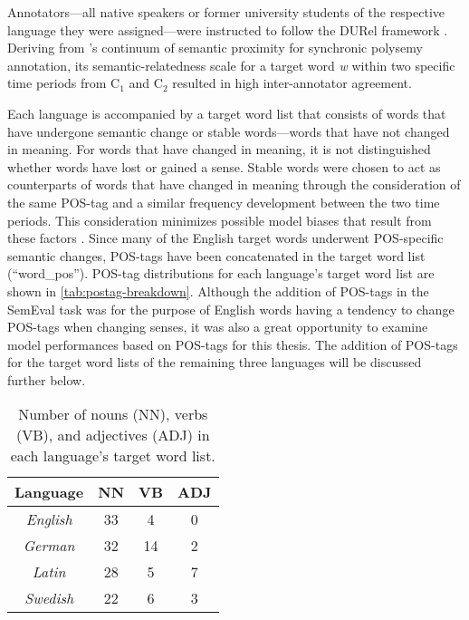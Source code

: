 Annotators—all native speakers or former university students of the respective language they were assigned—were instructed to follow the DURel framework \citep{DURel2018}. Deriving from \citet{blank1997prinzipien}’s continuum of semantic proximity for synchronic polysemy annotation, its semantic-relatedness scale for a target word \emph{w} within two specific time periods from C$_1$ and C$_2$ resulted in high inter-annotator agreement. 
	
Each language is accompanied by a target word list that consists of words that have undergone semantic change or stable words—words that have not changed in meaning. For words that have changed in meaning, it is not distinguished whether words have lost or gained a sense. Stable words were chosen to act as counterparts of words that have changed in meaning through the consideration of the same POS-tag and a similar frequency development between the two time periods. This consideration minimizes possible model biases that result from these factors \citep{dubossarsky-etal-2017-outta}. Since many of the English target words underwent POS-specific semantic changes, POS-tags have been concatenated in the target word list (“word\_pos”). POS-tag distributions for each language's target word list are shown in \autoref{tab:postag-breakdown}. Although the addition of POS-tags in the SemEval task was for the purpose of English words having a tendency to change POS-tags when changing senses, it was also a great opportunity to examine model performances based on POS-tags for this thesis. The addition of POS-tags for the target word lists of the remaining three languages will be discussed further below.
 
\begin{table}[h]
\small
\centering
\begin{tabular}{|c|c|c|c|}
\hline
\textbf{Language} & \textbf{NN} & \textbf{VB} & \textbf{ADJ} \\ \hline
\textit{English}                          & 33          & 4           & 0            \\ \hline
\textit{German}                           & 32          & 14          & 2            \\ \hline
\textit{Latin}                            & 28          & 5           & 7            \\ \hline
\textit{Swedish}                          & 22          & 6           & 3            \\ \hline
\end{tabular}
\caption{Number of nouns (NN), verbs (VB), and adjectives (ADJ) in each language's target word list.}
\label{tab:postag-breakdown}
\end{table}

